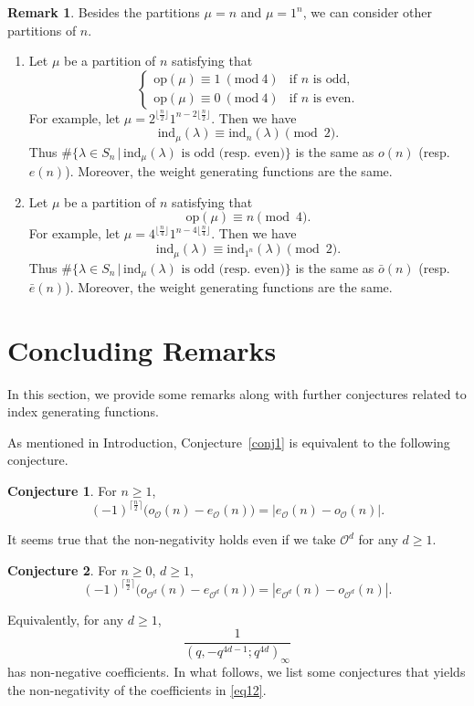 \documentclass[reqno]{amsart}
\theoremstyle{definition}
\newtheorem{rmk}{Remark}%
\newtheorem{cnj}{Conjecture}%
\newcommand{\ind}{\mathrm{ind}}
\newcommand{\op}{\mathrm{op}}
\newcommand{\opa}{\mathcal{O}}
\newcommand{\lam}{\lambda}
\newcommand{\be}{\bar{e}}
\newcommand{\bo}{\bar{o}}
\newcommand{\Mod}[1]{\ (\mathrm{mod}\ #1)}
\begin{document}
\begin{rmk} 
Besides the partitions $\mu=n$ and $\mu=1^n$, we  can consider other partitions of $n$.
\begin{enumerate}
   \item 
Let $\mu$ be a partition of $n$ satisfying that
$$
\begin{cases}
\op(\mu) \equiv 1 \Mod{4} & \mbox{if $n$ is odd,}\\ 
\op(\mu) \equiv 0 \Mod{4} & \mbox{if $n$ is even.}
\end{cases}
$$
For example, let $\mu=2^{\lfloor \frac{n}{2} \rfloor} 1^{n-2\lfloor \frac{n}{2} \rfloor}$. Then we have 
$$
\ind_{\mu}(\lam) \equiv \ind_{n}(\lam) \pmod{2}.
$$
Thus $\# \{\lam\in S_n \, |\,   \mbox{$\ind_{\mu}(\lam)$ is odd (resp.~even)}\}$ is the same as $o(n)$ (resp. $e(n)$). Moreover, the weight generating functions are the same.

\item 
Let $\mu$ be a partition of $n$ satisfying that
$$
\op(\mu) \equiv n \pmod{4}.
$$
For example,  let  $\mu=4^{\lfloor \frac{n}{4} \rfloor} 1^{n-4\lfloor \frac{n}{4} \rfloor}$. Then we have 
$$
\ind_{\mu}(\lam) \equiv \ind_{1^n}(\lam) \pmod{2}.
$$
Thus $\# \{\lam\in S_n \, |\,   \mbox{$\ind_{\mu}(\lam)$ is odd (resp.~even)}\}$ is the same as $\bo(n)$ (resp. $\be(n)$). Moreover, the weight generating functions are the same.

\end{enumerate}
\end{rmk}

\section{Concluding Remarks}

In this section, we provide some remarks along with further conjectures related to index generating functions.

As mentioned in Introduction, Conjecture~\ref{conj1} is equivalent to the following conjecture. 

\begin{cnj} For $n\ge 1$,
$$(-1)^{ \lceil \frac{n}{2} \rceil } \big(o_{\opa}(n) -e_{\opa}(n) \big)=|e_{\opa}(n) -o_{\opa}(n) |.$$
\end{cnj}

It seems true that the non-negativity holds even if we take $\opa^{d}$ for any $d\ge 1$. 

\begin{cnj} For $n\ge 0$, $d\ge 1$,
$$(-1)^{ \lceil \frac{n}{2} \rceil } \big(o_{\opa^d}(n) -e_{\opa^d} (n) \big)=|e_{\opa^d}(n) -o_{\opa^d}(n) |. $$
\end{cnj}
Equivalently, for any $d\ge 1$, 
\begin{equation}
\frac{1}{(q,-q^{4d-1};q^{4d})_{\infty}} \label{eq12}
\end{equation}
has non-negative coefficients.  In what follows, we list some conjectures that yields the non-negativity of the coefficients in \eqref{eq12}. 
\end{document}
